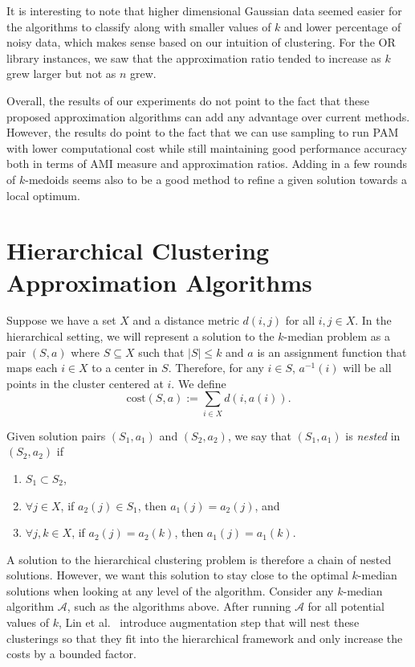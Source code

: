 \documentclass{article}
\begin{document}
It is interesting to note that higher dimensional Gaussian data seemed easier for the algorithms to classify along with smaller values of $k$ and lower percentage of noisy data, which makes sense based on our intuition of clustering. For the OR library instances, we saw that the approximation ratio tended to increase as $k$ grew larger but not as $n$ grew. 

Overall, the results of our experiments do not point to the fact that these proposed approximation algorithms can add any advantage over current methods. However, the results do point to the fact that we can use sampling to run PAM with lower computational cost while still maintaining good performance accuracy both in terms of AMI measure and approximation ratios. Adding in a few rounds of $k$-medoids seems also to be a good method to refine a given solution towards a local optimum.  

\section{Hierarchical Clustering Approximation Algorithms}
Suppose we have a set $X$ and a distance metric $d(i,j)$ for all $i,j \in X$. In the hierarchical setting, we will represent a solution to the $k$-median problem as a pair $(S, a)$ where $S \subseteq X$ such that $|S| \leq k$ and $a$ is an assignment function that maps each $i \in X$ to a center in $S$. Therefore, for any $i \in S$, $a^{-1}(i)$ will be all points in the cluster centered at $i$. We define
\[ \mathrm{cost}(S,a) := \sum_{i \in X} d(i, a(i)) . \]

Given solution pairs $(S_1, a_1)$ and $(S_2, a_2)$, we say that $(S_1, a_1)$ is \emph{nested} in $(S_2, a_2)$ if 
\begin{enumerate}
\item $S_1 \subset S_2$, 
\item  $\forall  j \in X$, if $a_2(j) \in S_1$, then $a_1(j) = a_2(j)$, and 
\item $\forall j, k \in X$, if $a_2(j) = a_2(k)$, then $a_1(j) = a_1(k)$.
\end{enumerate}
 A solution to the hierarchical clustering problem is therefore a chain of nested solutions. However, we want this solution to stay close to the optimal $k$-median solutions when looking at any level of the algorithm.  
Consider any $k$-median algorithm $\mathcal{A}$, such as the algorithms above. After running $\mathcal{A}$ for all potential values of $k$, Lin et al.~\cite{Lin} introduce  augmentation step that will nest these clusterings so that they fit into the hierarchical framework and only increase the costs by a bounded factor. 
\end{document}
